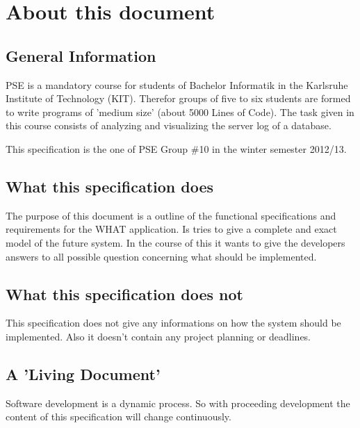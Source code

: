 \section*{About this document}


\subsection*{General Information}
PSE is a mandatory course for students of Bachelor Informatik in the %
Karlsruhe Institute of Technology (KIT). Therefor groups of five to six
students are formed to write programs of 'medium size' (about 5000 Lines of Code). 
The task given in this course consists of analyzing and visualizing the server log of a database.

This specification is the one of PSE Group \#10 in the winter semester 2012/13.


\subsection*{What this specification does}
The purpose of this document is a outline of the functional specifications and requirements
for the WHAT application. Is tries to give a complete and exact model of the future system.
In the course of this it wants to give the developers answers to all possible question concerning
what should be implemented.


\subsection*{What this specification does not}
This specification does not give any informations on how the system should be implemented. 
Also it doesn't contain any project planning or deadlines.


\subsection*{A 'Living Document'}
Software development is a dynamic process. So with proceeding development the
content of this specification will change continuously. 


